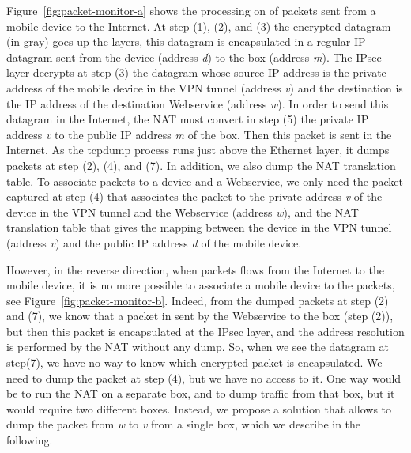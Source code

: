 Figure~\ref{fig:packet-monitor-a} shows the processing on \platname{}
of packets sent from a mobile device to the Internet. At step (1),
(2), and (3) the encrypted datagram (in gray) goes up the layers, this
datagram is encapsulated in a regular IP datagram sent from the device
(address \emph{d}) to the \platname{} box (address \emph{m}). The
IPsec layer decrypts at step (3) the datagram whose source IP address
is the private address of the mobile device in the VPN tunnel (address
\emph{v}) and the destination is the IP address of the destination
Webservice (address \emph{w}). In order to send this datagram in the
Internet, the NAT must convert in step (5) the private IP address
\emph{v} to the public IP address \emph{m} of the \platname{}
box. Then this packet is sent in the Internet. As the tcpdump process
runs just above the Ethernet layer, it dumps packets at step (2), (4),
and (7). In addition, we also dump the NAT translation
table. To associate packets to a device and a Webservice,
we only need the packet captured at step (4) that associates the
packet to the private address \emph{v} of the device in the VPN tunnel
and the Webservice (address \emph{w}), and the NAT translation table
that gives the mapping between the device in the VPN tunnel (address
\emph{v}) and the public IP address \emph{d} of the mobile device.

However, in the reverse direction, when packets flows from the
Internet to the mobile device, it is no more possible to associate a
mobile device to the packets, see
Figure~\ref{fig:packet-monitor-b}. Indeed, from the dumped packets at
step (2) and (7), we know that a packet in sent by the Webservice to
the \platname{} box (step (2)), but then this packet is encapsulated
at the IPsec layer, and the address resolution is performed by the NAT
without any dump. So, when we see the datagram at step(7), we have no
way to know which encrypted packet is encapsulated. We need to dump
the packet at step (4), but we have no access to it. One way would be
to run the NAT on a separate box, and to dump traffic from that box,
but it would require two different boxes. Instead, we propose a
solution that allows to dump the packet from \emph{w} to \emph{v} from
a single box, which we describe in the following. 


